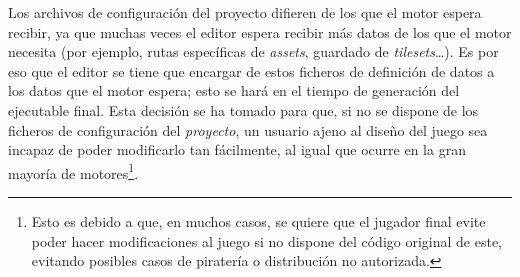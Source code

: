 \smallskip

Los archivos de configuración del proyecto difieren de los que el motor espera recibir, ya que muchas veces el editor espera recibir más datos de los que el motor necesita (por ejemplo, rutas específicas de \textit{assets}, guardado de \textit{tilesets}\ldots). Es por eso que el editor se tiene que encargar de  estos ficheros de definición de datos a los datos que el motor espera; esto se hará en el tiempo de generación del ejecutable final. Esta decisión se ha tomado para que, si no se dispone de los ficheros de configuración del \textit{proyecto}, un usuario ajeno al diseño del juego sea incapaz de poder modificarlo tan fácilmente, al igual que ocurre en la gran mayoría de motores\footnote{Esto es debido a que, en muchos casos, se quiere que el jugador final evite poder hacer modificaciones al juego si no dispone del código original de este, evitando posibles casos de piratería o distribución no autorizada.}.
